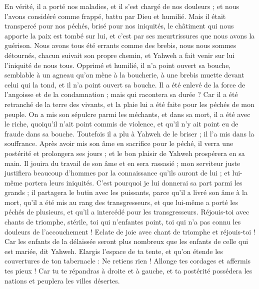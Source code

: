 \begin{multicols}{2}
En vérité, il a porté nos maladies, et il s'est chargé de nos douleurs ; et nous l'avons considéré comme frappé, battu par Dieu et humilié.
Mais il était transpercé pour nos péchés, brisé pour nos iniquités, le châtiment qui nous apporte la paix est tombé sur lui, et c'est par ses meurtrissures que nous avons la guérison.
Nous avons tous été errants comme des brebis, nous nous sommes détournés, chacun suivait son propre chemin, et Yahweh a fait venir sur lui l'iniquité de nous tous.
Opprimé et humilié, il n'a point ouvert sa bouche, semblable à un agneau qu'on mène à la boucherie, à une brebis muette devant celui qui la tond, et il n'a point ouvert sa bouche.
Il a été enlevé de la force de l'angoisse et de la condamnation ; mais qui racontera sa durée ? Car il a été retranché de la terre des vivants, et la plaie lui a été faite pour les péchés de mon peuple.
On a mis son sépulcre parmi les méchants, et dans sa mort, il a été avec le riche, quoiqu'il n'ait point commis de violence, et qu'il n'y ait point eu de fraude dans sa bouche.
Toutefois il a plu à Yahweh de le briser ; il l'a mis dans la souffrance. Après avoir mis son âme en sacrifice pour le péché, il verra une postérité et prolongera ses jours ; et le bon plaisir de Yahweh prospérera en sa main.
Il jouira du travail de son âme et en sera rassasié ; mon serviteur juste justifiera beaucoup d'hommes par la connaissance qu'ils auront de lui ; et lui-même portera leurs iniquités.
C'est pourquoi je lui donnerai sa part parmi les grands ; il partagera le butin avec les puissants, parce qu'il a livré son âme à la mort, qu'il a été mis au rang des transgresseurs, et que lui-même a porté les péchés de plusieurs, et qu'il a intercédé pour les transgresseurs.
\VerseOne{}Réjouis-toi avec chants de triomphe, stérile, toi qui n'enfantes point, toi qui n'a pas connu les douleurs de l'accouchement ! Eclate de joie avec chant de triomphe et réjouis-toi ! Car les enfants de la délaissée seront plus nombreux que les enfants de celle qui est mariée, dit Yahweh.
Elargis l'espace de ta tente, et qu'on étende les couvertures de ton tabernacle : Ne retiens rien ! Allonge tes cordages et affermis tes pieux !
Car tu te répandras à droite et à gauche, et ta postérité possédera les nations et peuplera les villes désertes.

\end{multicols}
